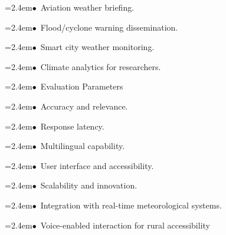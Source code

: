 \documentclass[10pt,a4paper]{article}
\begin{document}
\begin{tcolorbox}[pscard, title={"\textbf{SIH26068} \quad $\vert$ \quad WeatherGPT: Conversational AI for Weather Forecasting, Alerts, and Climate ...}]
\noindent\hspace*{1.2em}\hangindent=2.4em\textcolor{sihblue}{$\bullet$}~\small Aviation weather briefing.\par\vspace{0.05cm}
\noindent\hspace*{1.2em}\hangindent=2.4em\textcolor{sihblue}{$\bullet$}~\small Flood/cyclone warning dissemination.\par\vspace{0.05cm}
\noindent\hspace*{1.2em}\hangindent=2.4em\textcolor{sihblue}{$\bullet$}~\small Smart city weather monitoring.\par\vspace{0.05cm}
\noindent\hspace*{1.2em}\hangindent=2.4em\textcolor{sihblue}{$\bullet$}~\small Climate analytics for researchers.\par\vspace{0.05cm}
\noindent\hspace*{1.2em}\hangindent=2.4em\textcolor{sihblue}{$\bullet$}~\small Evaluation Parameters\par\vspace{0.05cm}
\noindent\hspace*{1.2em}\hangindent=2.4em\textcolor{sihblue}{$\bullet$}~\small Accuracy and relevance.\par\vspace{0.05cm}
\noindent\hspace*{1.2em}\hangindent=2.4em\textcolor{sihblue}{$\bullet$}~\small Response latency.\par\vspace{0.05cm}
\noindent\hspace*{1.2em}\hangindent=2.4em\textcolor{sihblue}{$\bullet$}~\small Multilingual capability.\par\vspace{0.05cm}
\noindent\hspace*{1.2em}\hangindent=2.4em\textcolor{sihblue}{$\bullet$}~\small User interface and accessibility.\par\vspace{0.05cm}
\noindent\hspace*{1.2em}\hangindent=2.4em\textcolor{sihblue}{$\bullet$}~\small Scalability and innovation.\par\vspace{0.05cm}
\noindent\hspace*{1.2em}\hangindent=2.4em\textcolor{sihblue}{$\bullet$}~\small Integration with real-time meteorological systems.\par\vspace{0.05cm}
\noindent\hspace*{1.2em}\hangindent=2.4em\textcolor{sihblue}{$\bullet$}~\small Voice-enabled interaction for rural accessibility\par\vspace{0.05cm}

\end{tcolorbox}
\end{document}
